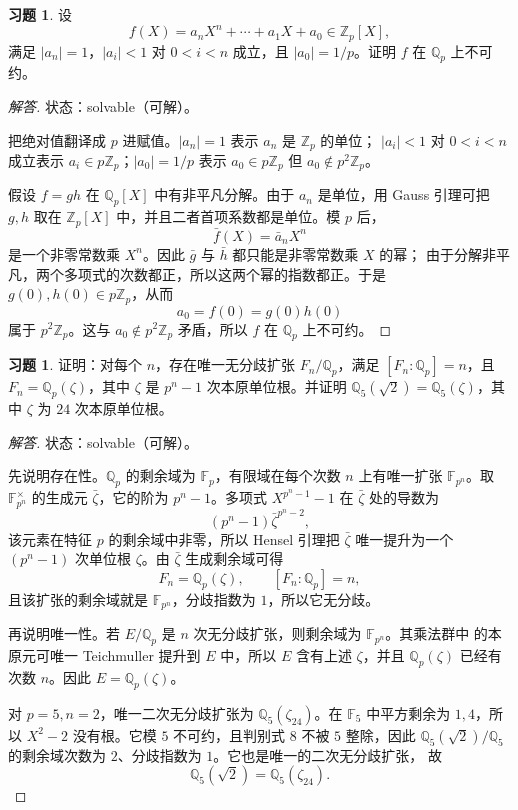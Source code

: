 \documentclass[11pt,a4paper,openany]{ctexbook}
\numberwithin{equation}{chapter}
\newcommand{\Q}{\mathbb{Q}}
\newcommand{\Z}{\mathbb{Z}}
\newcommand{\F}{\mathbb{F}}
\theoremstyle{plain}
\theoremstyle{definition}
\newtheorem{exercise}[theorem]{习题}
\theoremstyle{remark}
\begin{document}
\begin{exercise}
设
\[
f(X)=a_nX^n+\cdots+a_1X+a_0\in\Z_p[X],
\]
满足 $|a_n|=1$，$|a_i|<1$ 对 $0<i<n$ 成立，且 $|a_0|=1/p$。证明 $f$ 在 $\Q_p$ 上不可约。
\end{exercise}

\begin{proof}[解答]
状态：solvable（可解）。

把绝对值翻译成 $p$ 进赋值。$|a_n|=1$ 表示 $a_n$ 是 $\Z_p$ 的单位；
$|a_i|<1$ 对 $0<i<n$ 成立表示 $a_i\in p\Z_p$；$|a_0|=1/p$ 表示
$a_0\in p\Z_p$ 但 $a_0\notin p^2\Z_p$。

假设 $f=gh$ 在 $\Q_p[X]$ 中有非平凡分解。由于 $a_n$ 是单位，用 Gauss 引理可把
$g,h$ 取在 $\Z_p[X]$ 中，并且二者首项系数都是单位。模 $p$ 后，
\[
\bar f(X)=\bar a_nX^n
\]
是一个非零常数乘 $X^n$。因此 $\bar g$ 与 $\bar h$ 都只能是非零常数乘 $X$ 的幂；
由于分解非平凡，两个多项式的次数都正，所以这两个幂的指数都正。于是
$g(0),h(0)\in p\Z_p$，从而
\[
a_0=f(0)=g(0)h(0)
\]
属于 $p^2\Z_p$。这与 $a_0\notin p^2\Z_p$ 矛盾，所以 $f$ 在 $\Q_p$ 上不可约。
\end{proof}

\begin{exercise}
证明：对每个 $n$，存在唯一无分歧扩张 $F_n/\Q_p$，满足 $[F_n:\Q_p]=n$，且 $F_n=\Q_p(\zeta)$，其中 $\zeta$ 是 $p^n-1$ 次本原单位根。并证明 $\Q_5(\sqrt2)=\Q_5(\zeta)$，其中 $\zeta$ 为 $24$ 次本原单位根。
\end{exercise}

\begin{proof}[解答]
状态：solvable（可解）。

先说明存在性。$\Q_p$ 的剩余域为 $\F_p$，有限域在每个次数 $n$ 上有唯一扩张
$\F_{p^n}$。取 $\F_{p^n}^\times$ 的生成元 $\bar\zeta$，它的阶为 $p^n-1$。多项式
$X^{p^n-1}-1$ 在 $\bar\zeta$ 处的导数为
\[
(p^n-1)\bar\zeta^{p^n-2},
\]
该元素在特征 $p$ 的剩余域中非零，所以 Hensel 引理把 $\bar\zeta$ 唯一提升为一个
$(p^n-1)$ 次单位根 $\zeta$。由 $\bar\zeta$ 生成剩余域可得
\[
F_n=\Q_p(\zeta),\qquad [F_n:\Q_p]=n,
\]
且该扩张的剩余域就是 $\F_{p^n}$，分歧指数为 $1$，所以它无分歧。

再说明唯一性。若 $E/\Q_p$ 是 $n$ 次无分歧扩张，则剩余域为 $\F_{p^n}$。其乘法群中
的本原元可唯一 Teichmuller 提升到 $E$ 中，所以 $E$ 含有上述 $\zeta$，并且
$\Q_p(\zeta)$ 已经有次数 $n$。因此 $E=\Q_p(\zeta)$。

对 $p=5,n=2$，唯一二次无分歧扩张为 $\Q_5(\zeta_{24})$。在 $\F_5$ 中平方剩余为
$1,4$，所以 $X^2-2$ 没有根。它模 $5$ 不可约，且判别式 $8$ 不被 $5$ 整除，因此
$\Q_5(\sqrt2)/\Q_5$ 的剩余域次数为 $2$、分歧指数为 $1$。它也是唯一的二次无分歧扩张，
故
\[
\Q_5(\sqrt2)=\Q_5(\zeta_{24}).
\]
\end{proof}
\end{document}
